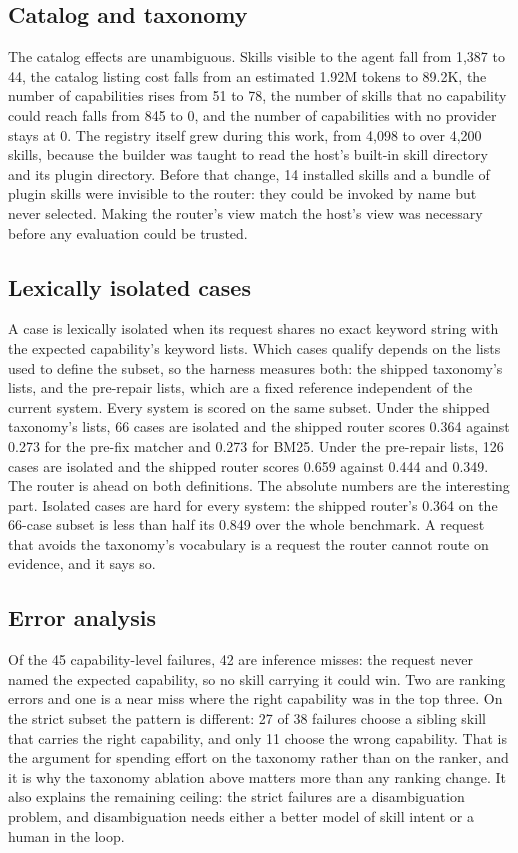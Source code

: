 \documentclass[sigconf,acmsmall]{acmart}
\begin{document}
\subsection{Catalog and taxonomy}
The catalog effects are unambiguous. Skills visible to the agent fall from 1,387 to 44, the catalog listing cost falls from an estimated 1.92M tokens to 89.2K, the number of capabilities rises from 51 to 78, the number of skills that no capability could reach falls from 845 to 0, and the number of capabilities with no provider stays at 0.
The registry itself grew during this work, from 4,098 to over 4,200 skills, because the builder was taught to read the host's built-in skill directory and its plugin directory. Before that change, 14 installed skills and a bundle of plugin skills were invisible to the router: they could be invoked by name but never selected. Making the router's view match the host's view was necessary before any evaluation could be trusted.

\subsection{Lexically isolated cases}
A case is lexically isolated when its request shares no exact keyword string with the expected capability's keyword lists. Which cases qualify depends on the lists used to define the subset, so the harness measures both: the shipped taxonomy's lists, and the pre-repair lists, which are a fixed reference independent of the current system. Every system is scored on the same subset.
Under the shipped taxonomy's lists, 66 cases are isolated and the shipped router scores 0.364 against 0.273 for the pre-fix matcher and 0.273 for BM25. Under the pre-repair lists, 126 cases are isolated and the shipped router scores 0.659 against 0.444 and 0.349. The router is ahead on both definitions.
The absolute numbers are the interesting part. Isolated cases are hard for every system: the shipped router's 0.364 on the 66-case subset is less than half its 0.849 over the whole benchmark. A request that avoids the taxonomy's vocabulary is a request the router cannot route on evidence, and it says so.

\subsection{Error analysis}
Of the 45 capability-level failures, 42 are inference misses: the request never named the expected capability, so no skill carrying it could win. Two are ranking errors and one is a near miss where the right capability was in the top three. On the strict subset the pattern is different: 27 of 38 failures choose a sibling skill that carries the right capability, and only 11 choose the wrong capability.
That is the argument for spending effort on the taxonomy rather than on the ranker, and it is why the taxonomy ablation above matters more than any ranking change. It also explains the remaining ceiling: the strict failures are a disambiguation problem, and disambiguation needs either a better model of skill intent or a human in the loop.
\end{document}
